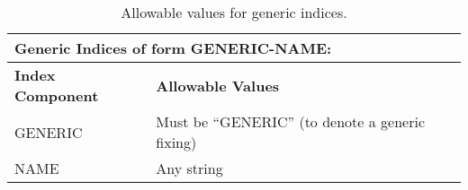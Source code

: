 \begin{table}[H]
\centering
\begin{tabular}{|l|l|}
\hline
\multicolumn{2}{|l|}{\textbf{Generic Indices of form GENERIC-NAME:}} \\
\hline
\textbf{Index Component} & \textbf{Allowable Values} \\
\hline
GENERIC          & Must be ``GENERIC'' (to denote a generic fixing) \\
\hline
NAME		     & Any string \\
\hline
\end{tabular}
\caption{Allowable values for generic indices.}
\label{tab:generic_indices}
\end{table}


